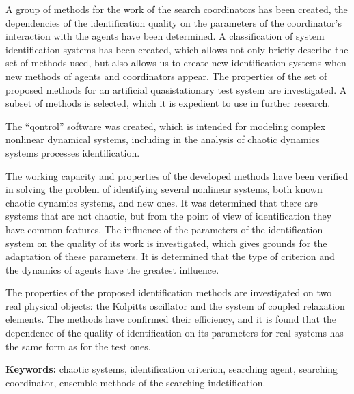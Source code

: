 A group of methods for the work of the search coordinators has been created,
the dependencies of the identification quality on the parameters of the
coordinator's interaction with the agents have been determined. A
classification of system identification systems has been created, which allows
not only briefly describe the set of methods used, but also allows us to
create new identification systems when new methods of agents and coordinators
appear. The properties of the set of proposed methods for an artificial
quasistationary test system are investigated. A subset of methods is selected,
which it is expedient to use in further research.



The ``qontrol'' software was created, which is intended for modeling complex
nonlinear dynamical systems, including in the analysis of chaotic dynamics systems processes identification.

The working capacity and properties of the developed methods have been verified
in solving the problem of identifying several nonlinear systems, both known
chaotic dynamics systems, and new ones. It was determined that there are
systems that are not chaotic, but from the point of view of identification they
have common features. The influence of the parameters of the identification
system on the quality of its work is investigated, which gives grounds for the
adaptation of these parameters. It is determined that the type of criterion and
the dynamics of agents have the greatest influence.

The properties of the proposed identification methods are investigated on two
real physical objects: the Kolpitts oscillator and the system of coupled
relaxation elements. The methods have confirmed their efficiency, and it is
found that the dependence of the quality of identification on its parameters
for real systems has the same form as for the test ones.


\textbf{Keywords:}
chaotic systems,
identification criterion,
searching agent,
searching coordinator,
ensemble methods of the searching indetification.

